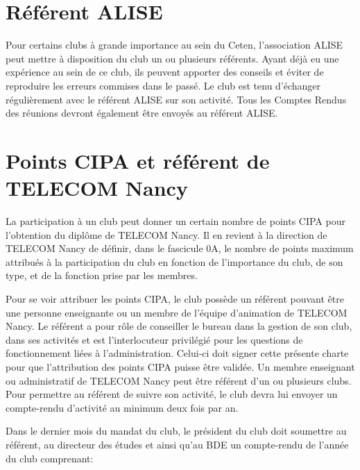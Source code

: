 \documentclass{article}
\begin{document}
\begin{multicols}{2}
{		}
		
		\section{Référent ALISE}

		{\small

			Pour certains clubs à grande importance au sein du Ceten,
			l’association ALISE peut mettre à disposition du club un ou
			plusieurs référents. Ayant déjà eu une expérience au sein de
			ce club, ils peuvent apporter des conseils et éviter de
			reproduire les erreurs commises dans le passé. Le club est
			tenu d’échanger régulièrement avec le référent ALISE sur
			son activité. Tous les Comptes Rendus des réunions devront
			également être envoyés au référent ALISE\@.

		}
		
		\section{Points CIPA et référent de TELECOM Nancy}

		{\small

			La participation à un club peut donner un certain nombre de
			points CIPA pour l’obtention du diplôme de TELECOM
			Nancy. Il en revient à la direction de TELECOM Nancy de
			définir, dans le fascicule 0A, le nombre de points maximum
			attribués à la participation du club en fonction de
			l’importance du club, de son type, et de la fonction prise par
			les membres.

			Pour se voir attribuer les points CIPA, le club possède un
			référent pouvant être une personne enseignante ou un
			membre de l’équipe d’animation de TELECOM Nancy. Le
			référent a pour rôle de conseiller le bureau dans la gestion
			de son club, dans ses activités et est l’interlocuteur privilégié
			pour les questions de fonctionnement liées à
			l’administration. Celui-ci doit signer cette présente charte
			pour que l’attribution des points CIPA puisse être validée.
			Un membre enseignant ou administratif de TELECOM Nancy
			peut être référent d’un ou plusieurs clubs. Pour permettre
			au référent de suivre son activité, le club devra lui envoyer
			un compte-rendu d’activité au minimum deux fois par an.

			Dans le dernier mois du mandat du club, le président du
			club doit soumettre au référent, au directeur des études et
			ainsi qu’au BDE un compte-rendu de l’année du club
			comprenant:

}
\end{multicols}
\end{document}
